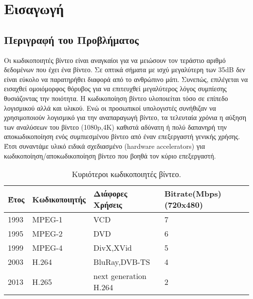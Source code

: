 ﻿\chapter{Εισαγωγή}
\label{chapter:chap1}

\section{Περιγραφή του Προβλήματος}
\label{section:sect11}
\indent
Οι κωδικοποιητές βίντεο είναι αναγκαίοι για να μειώσουν τον τεράστιο αριθμό δεδομένων που έχει ένα βίντεο. Σε οπτικά σήματα με ισχύ μεγαλύτερη των \si{35}{dB} δεν είναι εύκολο να παρατηρήθει διαφορά από το ανθρώπινο μάτι. Συνεπώς, επιλέγεται να εισαχθεί ομοιόμορφος θόρυβος για να επιτευχθεί μεγαλύτερος λόγος συμπίεσης θυσιάζοντας την ποιότητα.
Η κωδικοποίηση βίντεο υλοποιείται τόσο σε επίπεδο λογισμικού αλλά και υλικού. Ενώ οι προσωπικοί υπολογιστές συνήθιζαν να χρησιμοποιούν λογισμικό για την αναπαραγωγή βίντεο, τα τελευταία χρόνια η αύξηση των αναλύσεων του βίντεο (1080p,4K) καθιστά αδύνατη ή πολύ δαπανηρή την αποκωδικοποίηση ενός συμπιεσμένου βίντεο από έναν επεξεργαστή γενικής χρήσης. Έτσι συναντάμε υλικό ειδικά σχεδιασμένο (hardware accelerators) για κωδικοποίηση/αποκωδικοποίηση βίντεο που βοηθά τον κύριο επεξεργαστή.

\begin{table}[h!]
    \begin{center}
        \begin{tabular}{| l | l | l | l |}
        \hline
        Έτος  & Κωδικοποιητής   & Διάφορες Χρήσεις      &      Bitrate(Mbps) (720x480)  \\ \hline
        1993    & MPEG-1        &       VCD             &       7                		\\ \hline
        1995    & MPEG-2        &       DVD             &       6                		\\ \hline
        1999    & MPEG-4        &    DivX,XVid          &       5                		\\ \hline
        2003    & H.264         & BluRay,DVB-TS         &       4                		\\ \hline
        2013    & H.265         & next generation H.264 &       2                		\\ \hline
        \hline
        \end{tabular}
    \end{center}

    \caption{Κυριότεροι κωδικοποιητές βίντεο. \cite{wiki:codecs}}
    \label{table:listofcodecs}
\end{table}

